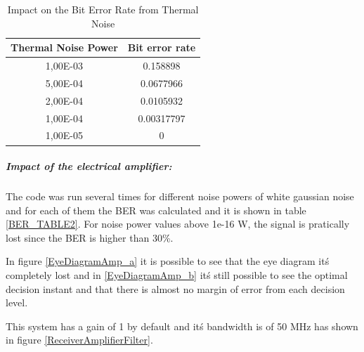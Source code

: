 \begin{table}[h]
\begin{center}
	\begin{tabular}{| c | c | }
		\hline
		\textbf{Thermal Noise Power} & \textbf{Bit error rate} \\ \hline
        1,00E-03 & 0.158898 \\ \hline
        5,00E-04 & 0.0677966 \\ \hline
        2,00E-04 & 0.0105932 \\ \hline
        1,00E-04 & 0.00317797 \\ \hline
        1,00E-05 & 0 \\ \hline
	\end{tabular}
	\caption{Impact on the Bit Error Rate from Thermal Noise} \label{BER_TABLE1}
\end{center}
\end{table}

\subparagraph*{Impact of the electrical amplifier:}

The code was run several times for different noise powers of white gaussian noise and for each of them the BER was calculated and it is shown in table \ref{BER_TABLE2}. For noise power values above 1e-16 W, the signal is pratically lost since the BER is higher than 30\%.

In figure \ref{EyeDiagramAmp_a} it is possible to see that the eye diagram it\'s completely lost and in \ref{EyeDiagramAmp_b} it\'s still possible to see the optimal decision instant and that there is almost no margin of error from each decision level.

This system has a gain of 1 by default and it\'s bandwidth is of 50 MHz has shown in figure \ref{ReceiverAmplifierFilter}.

